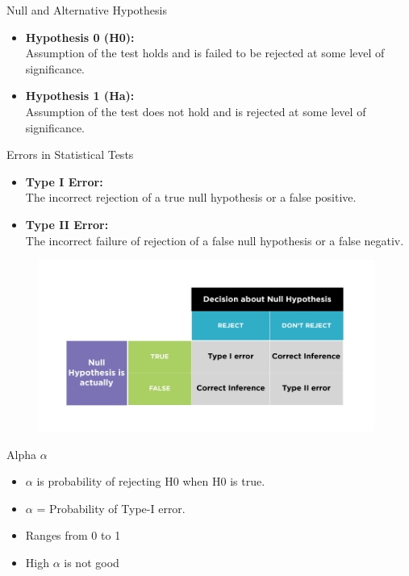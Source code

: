 \begin{frame}[t]{Null and Alternative Hypothesis}
	\begin{itemize}
		\item \textbf{Hypothesis 0 (H0):} \\
		Assumption of the test holds and is failed to be rejected at some level of significance.
		\item \textbf{Hypothesis 1 (Ha):} \\
		Assumption of the test does not hold and is rejected at some level of significance.
	\end{itemize}
	
\end{frame}

\begin{frame}[t]{Errors in Statistical Tests}
	\begin{itemize}
		\item \textbf{Type I Error:} \\
		The incorrect rejection of a true null hypothesis or a false positive.
		\item \textbf{Type II Error:} \\
		The incorrect failure of rejection of a false null hypothesis or a false negativ.
	\end{itemize}
	\begin{figure}
		\includegraphics[width=11cm]{img/errors}
	\end{figure}
\end{frame}
\begin{frame}[t]{Alpha ${\alpha}$}
	\begin{itemize}
		\item ${\alpha}$ is probability of rejecting H0 when H0 is true.
	 	\item ${\alpha}$ = Probability of Type-I error.
		\item Ranges from 0 to 1
		\item High ${\alpha}$ is not good
	\end{itemize}
\end{frame}
